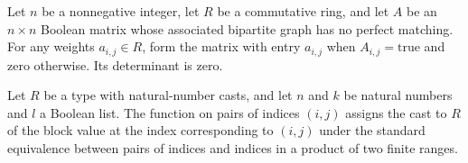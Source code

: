 \begin{theorem}
\label{Randomized.Matching.det_lovaszMatrix_eq_zero}
\leanok
{}
Let $n$ be a nonnegative integer, let $R$ be a commutative ring, and let $A$ be an
$n\times n$ Boolean matrix whose associated bipartite graph has no perfect matching. For
any weights $a_{i,j}\in R$, form the matrix with entry $a_{i,j}$ when
$A_{i,j}=\mathrm{true}$ and zero otherwise. Its determinant is zero.
\end{theorem}

\begin{definition}
\label{Randomized.Matching.lovaszSample}
\leanok
{}
Let $R$ be a type with natural-number casts, and let $n$ and $k$ be natural numbers and
$l$ a Boolean list. The function on pairs of indices $(i,j)$ assigns the cast to $R$ of
the block value at the index corresponding to $(i,j)$ under the standard equivalence
between pairs of indices and indices in a product of two finite ranges.
\end{definition}

